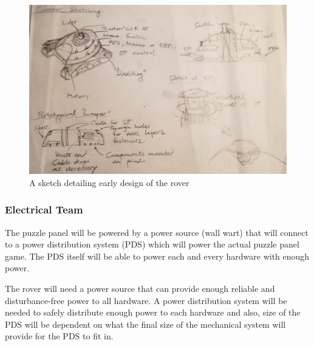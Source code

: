 \documentclass[a4paper, 10pt]{article}
\begin{document}
		\begin{figure} [!h]
			\centering
			\includegraphics[scale=0.15]{Photos/sketch}
			\caption{A sketch detailing early design of the rover}
			\label{layered_sketch}
		\end{figure}
		
		\subsubsection{Electrical Team}
		The puzzle panel will be powered by a power source (wall wart) that will connect to a power distribution system (PDS) which will power the actual puzzle panel game. The PDS itself will be able to power each and every hardware with enough power.

		The rover will need a power source that can provide enough reliable and disturbance-free power to all hardware. A power distribution system will be needed to safely distribute enough power to each hardware and also, size of the PDS will be dependent on what the final size of the mechanical system will provide for the PDS to fit in.  
		
\end{document}
